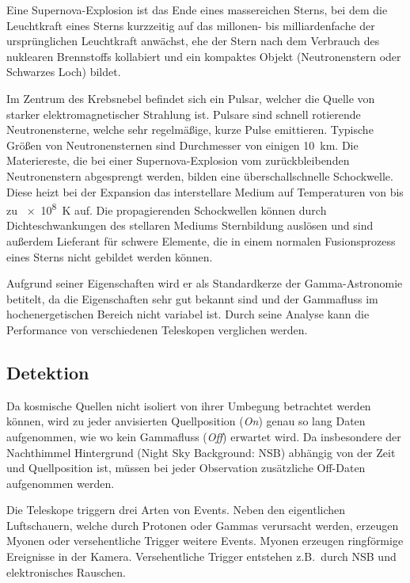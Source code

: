 Eine Supernova-Explosion ist das Ende eines massereichen Sterns,
bei dem die Leuchtkraft eines Sterns kurzzeitig auf das millonen- bis 
milliardenfache der ursprünglichen Leuchtkraft anwächst, 
ehe der Stern nach dem Verbrauch des
nuklearen Brennstoffs kollabiert und ein kompaktes Objekt 
(Neutronenstern oder Schwarzes Loch) bildet.

Im Zentrum des Krebsnebel befindet sich ein Pulsar, 
welcher die Quelle von starker elektromagnetischer Strahlung ist.
Pulsare sind schnell rotierende Neutronensterne,
welche sehr regelmäßige, kurze Pulse emittieren.
Typische Größen von Neutronensternen sind Durchmesser von einigen
\SI{10}{\kilo\meter}.
Die Materiereste, die bei einer Supernova-Explosion
vom zurückbleibenden Neutronenstern abgesprengt werden,
bilden eine überschallschnelle Schockwelle.
Diese heizt bei der Expansion das interstellare Medium auf Temperaturen von bis zu
\SI{e8}{\kelvin} auf.
Die propagierenden Schockwellen können durch Dichteschwankungen des stellaren
Mediums Sternbildung auslösen 
und sind außerdem Lieferant für schwere Elemente, die in einem normalen
Fusionsprozess eines Sterns nicht gebildet werden können. 

Aufgrund seiner Eigenschaften wird er als Standardkerze der Gamma-Astronomie betitelt,
da die Eigenschaften sehr gut bekannt sind
und der Gammafluss im hochenergetischen Bereich nicht variabel ist.
Durch seine Analyse kann die Performance von verschiedenen Teleskopen verglichen werden.

\subsection*{Detektion}%
\label{sub:wobbelmodus}

Da kosmische Quellen nicht isoliert von ihrer Umbegung betrachtet 
werden können,
wird zu jeder anvisierten Quellposition (\textit{On}) 
genau so lang Daten aufgenommen, 
wie wo kein Gammafluss (\textit{Off}) erwartet wird.
Da insbesondere der Nachthimmel Hintergrund (Night Sky Background: NSB) abhängig von der Zeit und Quellposition ist,
müssen bei jeder Observation zusätzliche Off-Daten aufgenommen werden.

Die Teleskope triggern drei Arten von Events.
Neben den eigentlichen Luftschauern,
welche durch Protonen
oder Gammas verursacht werden,
erzeugen Myonen oder versehentliche Trigger weitere Events.
Myonen erzeugen ringförmige Ereignisse in der Kamera.
Versehentliche Trigger entstehen z.B.\ durch NSB und elektronisches Rauschen.

